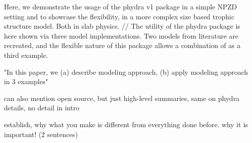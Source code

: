 \documentclass[template.tex]{subfiles}
\begin{document}
Here, we demonstrate the usage of the phydra v1 package in a simple NPZD setting and to showcase the flexibility, in a more complex size based trophic structure model. Both in slab physics.
//
The utility of the phydra package is here shown via three model implementations. Two models from literature are recreated, and the flexible nature of this package allows a combination of as a third example. 


"In this paper, we (a) describe modeling approach, (b) apply modeling approach in 3 examples"

can also mention open source, but just high-level summaries, same on phydra details, no detail in intro

establish, why what you make is different from everything done before. why it is important! (2 sentences)
\end{document}
